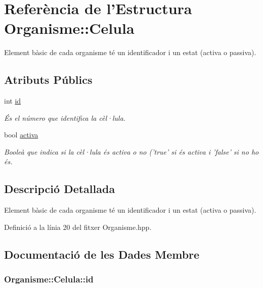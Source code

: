 \hypertarget{struct_organisme_1_1_celula}{\section{Referència de l'Estructura Organisme\-:\-:Celula}
\label{struct_organisme_1_1_celula}
}


Element bàsic de cada organisme té un identificador i un estat (activa o passiva).  


\subsection*{Atributs Públics}
\begin{DoxyCompactItemize}
\item 
int \hyperlink{struct_organisme_1_1_celula_a6ec9fac60cf77abda04fbe2d2c8eb43f}{id}
\begin{DoxyCompactList}\small\item\em És el número que identifica la cèl·lula. \end{DoxyCompactList}\item 
bool \hyperlink{struct_organisme_1_1_celula_ae76b8fe2263311c1a52e4fba8f649114}{activa}
\begin{DoxyCompactList}\small\item\em Booleà que indica si la cèl·lula és activa o no ('true' si és activa i 'false' si no ho és. \end{DoxyCompactList}\end{DoxyCompactItemize}


\subsection{Descripció Detallada}
Element bàsic de cada organisme té un identificador i un estat (activa o passiva). 

Definició a la línia 20 del fitxer Organisme.\-hpp.



\subsection{Documentació de les Dades Membre}
\hypertarget{struct_organisme_1_1_celula_a6ec9fac60cf77abda04fbe2d2c8eb43f}{
\subsubsection[{id}]{\setlength{\rightskip}{0pt plus 5cm}Organisme\-::\-Celula\-::id}}\label{struct_organisme_1_1_celula_a6ec9fac60cf77abda04fbe2d2c8eb43f}


